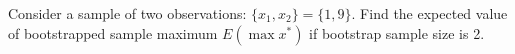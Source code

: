 
\begin{question}
Consider a sample of two observations: \(\{x_1,x_2\} = \{1, 9\}\). Find the expected value of bootstrapped sample maximum \(E(\max{x^*})\) if bootstrap sample size is 2.
\end{question}


